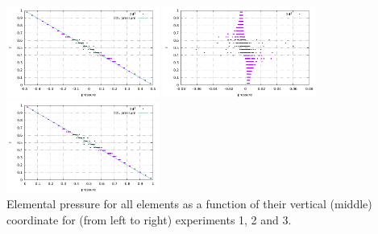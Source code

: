 \begin{center}
\includegraphics[width=5cm]{python_codes/fieldstone_10/results/model1/pressure.pdf}
\includegraphics[width=5cm]{python_codes/fieldstone_10/results/model2/pressure.pdf}
\includegraphics[width=5cm]{python_codes/fieldstone_10/results/model3/pressure.pdf}\\
{\captionfont Elemental pressure for all elements as a function of their vertical (middle) coordinate for
(from left to right) experiments 1, 2 and 3. }
\end{center}
